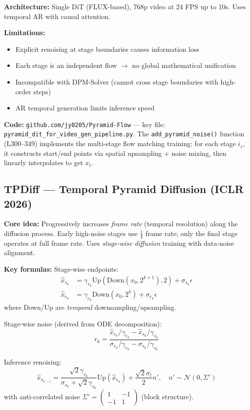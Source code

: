 \documentclass[11pt,a4paper]{article}
\begin{document}
\textbf{Architecture:} Single DiT (FLUX-based), 768p video at 24 FPS up to 10s. Uses temporal AR with causal attention.

\textbf{Limitations:}
\begin{itemize}[nosep]
\item Explicit renoising at stage boundaries causes information loss
\item Each stage is an independent flow $\to$ no global mathematical unification
\item Incompatible with DPM-Solver (cannot cross stage boundaries with high-order steps)
\item AR temporal generation limits inference speed
\end{itemize}

\textbf{Code:} \texttt{github.com/jy0205/Pyramid-Flow} --- key file: \texttt{pyramid\_dit\_for\_video\_gen\_pipeline.py}. The \texttt{add\_pyramid\_noise()} function (L300--349) implements the multi-stage flow matching training: for each stage $i_s$, it constructs start/end points via spatial upsampling + noise mixing, then linearly interpolates to get $x_t$.

\subsection{TPDiff --- Temporal Pyramid Diffusion (ICLR 2026)}

\textbf{Core idea:} Progressively increases \emph{frame rate} (temporal resolution) along the diffusion process. Early high-noise stages use $\frac{1}{4}$ frame rate; only the final stage operates at full frame rate. Uses \emph{stage-wise diffusion} training with data-noise alignment.

\textbf{Key formulas:}
Stage-wise endpoints:
\begin{align}
\hat{x}_{s_k} &= \gamma_{s_k} \text{Up}(\text{Down}(x_0, 2^{k+1}), 2) + \sigma_{s_k} \epsilon \\
\hat{x}_{e_k} &= \gamma_{e_k} \text{Down}(x_0, 2^k) + \sigma_{e_k} \epsilon
\end{align}
where Down/Up are \emph{temporal} downsampling/upsampling.

Stage-wise noise (derived from ODE decomposition):
\begin{equation}
\epsilon_k = \frac{\hat{x}_{e_k}/\gamma_{e_k} - \hat{x}_{s_k}/\gamma_{s_k}}{\sigma_{e_k}/\gamma_{e_k} - \sigma_{s_k}/\gamma_{s_k}}
\end{equation}

Inference renoising:
\begin{equation}
\hat{x}_{s_{k-1}} = \frac{\sqrt{2}\gamma_{s_k}}{\sigma_{s_k} + \sqrt{2}\gamma_{s_k}} \text{Up}(\hat{x}_{e_k}) + \frac{\sqrt{2}\sigma_t}{2} n', \quad n' \sim \mathcal{N}(0, \Sigma')
\end{equation}
with anti-correlated noise $\Sigma' = \begin{pmatrix}1 & -1 \\ -1 & 1\end{pmatrix}$ (block structure).
\end{document}
